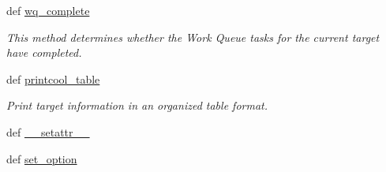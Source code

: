 \begin{DoxyCompactItemize}
def \hyperlink{classforcebalance_1_1target_1_1Target_af6099ec09486213869dba2491bd8ea04}{wq\-\_\-complete}
\begin{DoxyCompactList}\small\item\em This method determines whether the Work Queue tasks for the current target have completed. \end{DoxyCompactList}\item 
def \hyperlink{classforcebalance_1_1target_1_1Target_ac30a4e9d7d9fe06f7caefa5f7cfab09b}{printcool\-\_\-table}
\begin{DoxyCompactList}\small\item\em Print target information in an organized table format. \end{DoxyCompactList}\item 
def \hyperlink{classforcebalance_1_1BaseClass_a0c851d413c3b2f30561b72a46771bcff}{\-\_\-\-\_\-setattr\-\_\-\-\_\-}
\item 
def \hyperlink{classforcebalance_1_1BaseClass_a73e9a37a7632e79eb99f49bd15aced45}{set\-\_\-option}
\end{DoxyCompactItemize}
